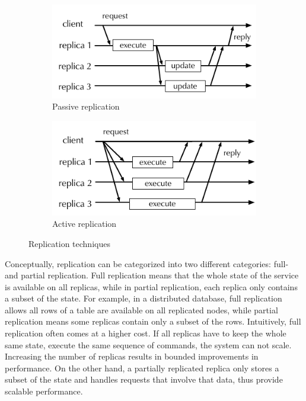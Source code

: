 \begin{figure}[ht!]
  \centering
  \begin{subfigure}[b]{0.49\textwidth}
    \centering
    \includegraphics[width=1\columnwidth]{figures/replication-passive}
    \caption{Passive replication}
    \label{fig:replication:passive}
  \end{subfigure}
  \begin{subfigure}[b]{0.49\textwidth}
    \centering
    \includegraphics[width=1\columnwidth]{figures/replication-active}
    \caption{Active replication}
    \label{fig:replication:active}
  \end{subfigure}
  \caption{Replication techniques}
  \label{fig:replication}
\end{figure}

Conceptually, replication can be categorized into two different categories:
full- and partial replication. Full replication means that the whole state of
the service is available on all replicas, while in partial replication, each
replica only contains a subset of the state. For example, in a distributed
database, full replication allows all rows of a table are available on all
replicated nodes, while partial replication means some replicas contain only a
subset of the rows. Intuitively, full replication often comes at a higher cost. If
all replicas have to keep the whole same state, execute the same sequence of
commands, the system can not scale. Increasing the number of replicas results in
bounded improvements in performance. On the other hand, a partially replicated
replica only stores a subset of the state and handles requests that involve that
data, thus provide scalable performance.

